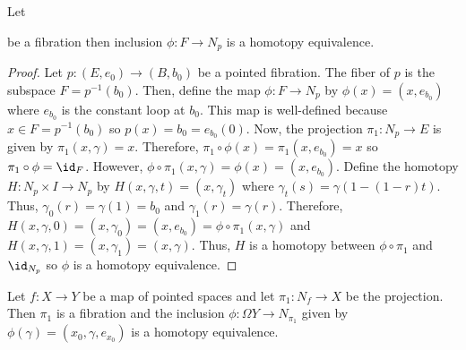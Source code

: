 \documentclass[12pt]{extarticle}
\begin{document}
\begin{lemma}
Let \begin{center}
\end{center}
be a fibration then inclusion $\phi : F \to N_p$ is a homotopy equivalence.  
\end{lemma}

\begin{proof} \label{fibrationgiveshomotopyfiber}
Let $p : (E, e_0) \to (B, b_0)$ be a pointed fibration. The fiber of $p$ is the subspace $F = p^{-1}(b_0)$. Then, define the map $\phi : F \to N_p$ by $\phi(x) = (x, e_{b_0})$ where $e_{b_0}$ is the constant loop at $b_0$. This map is well-defined because $x \in F = p^{-1}(b_0)$ so $p(x) = b_0 = e_{b_0}(0)$. Now, the projection $\pi_1 : N_p \to E$ is given by $\pi_1(x, \gamma) = x$. Therefore, $\pi_1 \circ \phi(x) = \pi_1(x, e_{b_0}) = x$ so $\pi_1 \circ \phi = \id_F$. However, $\phi \circ \pi_1(x, \gamma) = \phi(x) = (x, e_{b_0})$. Define the homotopy $H : N_p \times I \to N_p$ by $H(x, \gamma, t) = (x, \gamma_t)$ where $\gamma_t(s) = \gamma(1 - (1 - r) t)$. Thus, $\gamma_0(r) = \gamma(1) = b_0$ and $\gamma_1(r) = \gamma(r)$. Therefore, $H(x, \gamma, 0) = (x, \gamma_0) = (x, e_{b_0}) = \phi \circ \pi_1(x, \gamma)$ and $H(x, \gamma, 1) = (x, \gamma_1) = (x, \gamma)$. Thus, $H$ is a homotopy between $\phi \circ \pi_1$ and $\id_{N_p}$ so $\phi$ is a homotopy equivalence. 
\end{proof}

\begin{lemma} \label{mappingcoclyinderhasfibration}
Let $f : X \to Y$ be a map of pointed spaces and let $\pi_1 : N_f \to X$ be the projection. Then $\pi_1$ is a fibration and the inclusion $\phi : \Omega Y \to N_{\pi_1}$ given by $\phi(\gamma) = (x_0, \gamma, e_{x_0})$ is a homotopy equivalence.
\end{lemma}
\end{document}
